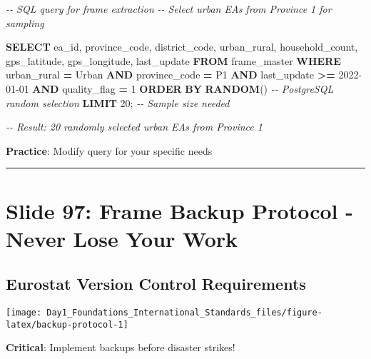 \documentclass[
]{article}
\newenvironment{Shaded}{\begin{snugshade}}{\end{snugshade}}
\newcommand{\CommentTok}[1]{\textcolor[rgb]{0.56,0.35,0.01}{\textit{#1}}}
\newcommand{\DecValTok}[1]{\textcolor[rgb]{0.00,0.00,0.81}{#1}}
\newcommand{\KeywordTok}[1]{\textcolor[rgb]{0.13,0.29,0.53}{\textbf{#1}}}
\newcommand{\NormalTok}[1]{#1}
\newcommand{\OperatorTok}[1]{\textcolor[rgb]{0.81,0.36,0.00}{\textbf{#1}}}
\newcommand{\StringTok}[1]{\textcolor[rgb]{0.31,0.60,0.02}{#1}}
\begin{document}
\begin{Shaded}
\begin{Highlighting}[]
\CommentTok{{-}{-} SQL query for frame extraction}
\CommentTok{{-}{-} Select urban EAs from Province 1 for sampling}

\KeywordTok{SELECT} 
\NormalTok{    ea\_id,}
\NormalTok{    province\_code,}
\NormalTok{    district\_code, }
\NormalTok{    urban\_rural,}
\NormalTok{    household\_count,}
\NormalTok{    gps\_latitude,}
\NormalTok{    gps\_longitude,}
\NormalTok{    last\_update}
\KeywordTok{FROM} 
\NormalTok{    frame\_master}
\KeywordTok{WHERE} 
\NormalTok{    urban\_rural }\OperatorTok{=} \StringTok{\textquotesingle{}Urban\textquotesingle{}} 
    \KeywordTok{AND}\NormalTok{ province\_code }\OperatorTok{=} \StringTok{\textquotesingle{}P1\textquotesingle{}}
    \KeywordTok{AND}\NormalTok{ last\_update }\OperatorTok{\textgreater{}=} \StringTok{\textquotesingle{}2022{-}01{-}01\textquotesingle{}}
    \KeywordTok{AND}\NormalTok{ quality\_flag }\OperatorTok{=} \DecValTok{1}
\KeywordTok{ORDER} \KeywordTok{BY} 
    \KeywordTok{RANDOM}\NormalTok{()  }\CommentTok{{-}{-} PostgreSQL random selection}
\KeywordTok{LIMIT} \DecValTok{20}\NormalTok{;     }\CommentTok{{-}{-} Sample size needed}

\CommentTok{{-}{-} Result: 20 randomly selected urban EAs from Province 1}
\end{Highlighting}
\end{Shaded}

\textbf{Practice}: Modify query for your specific needs

\begin{center}\rule{0.5\linewidth}{0.5pt}\end{center}

\section{Slide 97: Frame Backup Protocol - Never Lose Your
Work}\label{slide-97-frame-backup-protocol---never-lose-your-work}

\subsection{Eurostat Version Control
Requirements}\label{eurostat-version-control-requirements}

\texttt{[image: Day1\_Foundations\_International\_Standards\_files/figure-latex/backup-protocol-1]}

\textbf{Critical}: Implement backups before disaster strikes!
\end{document}
